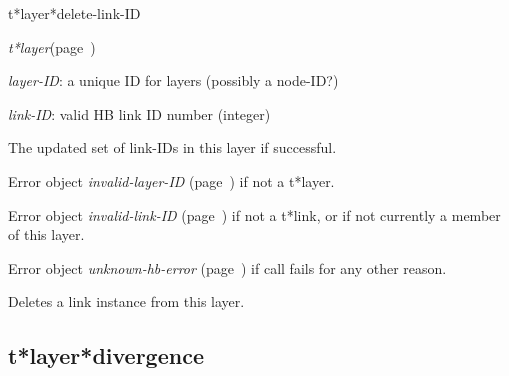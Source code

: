 \begin{description}
\item [Name:]  t*layer*delete-link-ID

\item [Class:] {\sl t*layer}\hfill(page~\pageref{t*layer})

\item [Parameters:]
\item {\sl layer-ID}:  a unique ID for layers (possibly a node-ID?)


\item {\sl link-ID}:  
valid HB link ID number (integer)


\item [Return-value:]
The updated set of link-IDs in this layer if successful.

Error object {\sl invalid-layer-ID} (page~\pageref{invalid-layer-ID}) if not a t*layer.

Error object {\sl invalid-link-ID} (page~\pageref{invalid-link-ID}) if not a t*link,
or if not currently a member of this layer.

Error object {\sl unknown-hb-error} (page~\pageref{unknown-hb-error}) if call fails
for any other reason.

\item [Description:]

Deletes a link instance from this layer.

\item [Public:]



\end{description}
\horizontalline

\subsection{t*layer*divergence}
\label{t*layer*divergence}

